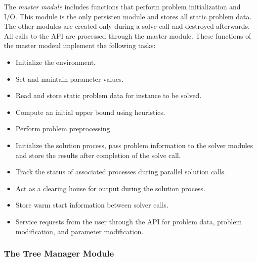 The {\em master module} includes functions that perform problem initialization
and I/O. This module is the only persisten module and stores all static
problem data. The other modules are created only during a solve call and
destroyed afterwards. All calls to the API are processed through the master
module. These functions of the master modeul implement the following tasks:
\begin{itemize}
        \item Initialize the environment.
        \item Set and maintain parameter values.
        \item Read and store static problem data for instance to be solved.
        \item Compute an initial upper bound using heuristics.
        \item Perform problem preprocessing.
        \item Initialize the solution process, pass problem information to the
        solver modules and store the results after completion of the solve 
	call.
        \item Track the status of associated processes during parallel
        solution calls.
        \item Act as a clearing house for output during the solution process.
        \item Store warm start information between solver calls.
        \item Service requests from the user through the API for problem data,
        problem modification, and parameter modification.
\end{itemize}

\subsubsection{The Tree Manager Module}

